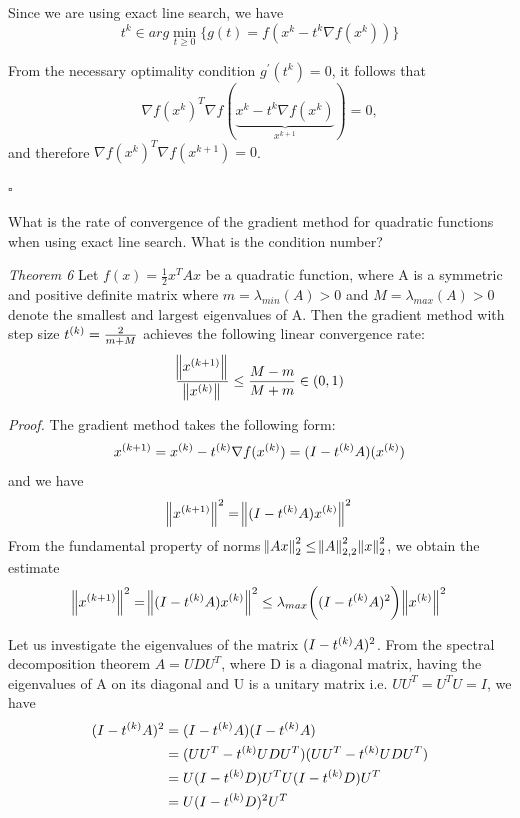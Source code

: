 \documentclass[12pt,a4paper]{article}
\begin{document}
	Since we are using exact line search, we have
	$$ t^{k} \in arg \min_{t \ge 0} \Big \{
	g(t) = f(x^{k}-t^{k} \nabla f(x^{k})) \Big \}$$
	
	From the necessary optimality condition $g^{'}(t^{k}) = 0$, it follows that
	$$ \nabla f(x^{k})^T \nabla f(\underbrace{x^{k}- t^{k}\nabla f(x^{k})}_{x^{k+1}}) = 0, $$
	and therefore $\nabla f(x^{k})^T \nabla f(x^{k+1}) = 0$.
	\begin{flushright}
		$\square$
	\end{flushright}
\begin{question}
What is the rate of convergence of the gradient method for quadratic functions when using exact line search. What is the condition number?
\end{question}

\textit{Theorem 6} Let $f(x) = \frac{1}{2}x^TAx$ be a quadratic function, where A is a
symmetric and positive definite matrix where $m = \lambda_{min}(A) > 0$ and $M = \lambda_{max}(A) > 0$ denote the smallest and largest
eigenvalues of A. Then the gradient method with step size $\kth{t} = \frac{2}{m+M}$ achieves the following linear convergence rate:
$$ \frac{\norm{\kth[k+1]{x}}}{\norm{\kth{x}}} \leq \frac{M-m}{M+m} \in (0,1) $$

\textit{Proof.} The gradient method takes the following form:
$$ \kth[k+1]{x} = \kth{x} - \kth{t}\nabla f(\kth{x}) = (I-\kth{t}A)(\kth{x})$$
and we have
$$\norm{\kth[k+1]{x}}^2 = \norm{(I-\kth{t}A)\kth{x}}^2$$
From the fundamental property of norms $\norm{Ax}^2_2 \leq \norm{A}^2_{2,2}\norm{x}^2_2$, we obtain the estimate
\begin{equation}
  \norm{\kth[k+1]{x}}^2 = \norm{(I-\kth{t}A)\kth{x}}^2 \leq \lambda_{max}\biggl((I-\kth{t}A)^2\biggr)\norm{\kth{x}}^2
  \label{eq:eigenvalue_norm}
\end{equation}

Let us investigate the eigenvalues of the matrix $(I-\kth{t}A)^2$. From the spectral decomposition
theorem $A = U D U^T$, where D is a diagonal matrix, having the eigenvalues of A on its diagonal and U is a unitary matrix i.e. $UU^T = U^TU = I$, we have
\begin{align*}
  (I-\kth{t}A)^2 &= (I-\kth{t}A)(I-\kth{t}A) \\
                 &= (UU^T-\kth{t}UDU^T)(UU^T-\kth{t}UDU^T) \\
                 &= U(I-\kth{t}D)U^TU(I-\kth{t}D)U^T \\
                 &= U(I-\kth{t}D)^2U^T
\end{align*}
\end{document}
